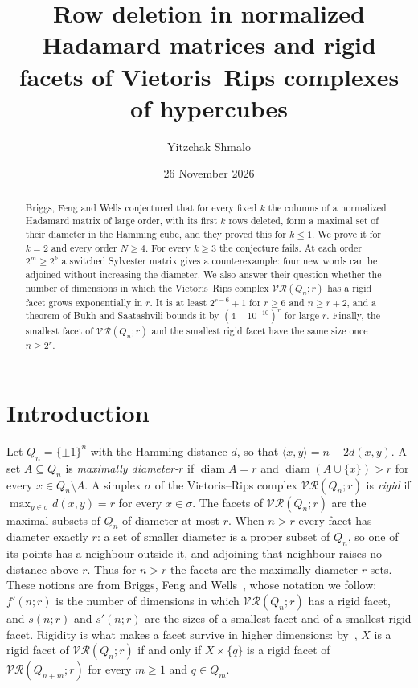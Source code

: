 \documentclass[11pt]{amsart}
\theoremstyle{remark}
\newcommand{\VR}{\mathcal{VR}}
\DeclareMathOperator{\diam}{diam}
\begin{document}
\title[Row deletion and rigid facets]{Row deletion in normalized Hadamard matrices and rigid facets of
Vietoris--Rips complexes of hypercubes}
\author{Yitzchak Shmalo}
\date{26 November 2026}
\address{Einstein Institute of Mathematics, The Hebrew University of Jerusalem, Jerusalem, Israel}

\begin{abstract}
Briggs, Feng and Wells conjectured that for every fixed $k$ the columns of a normalized Hadamard matrix of large order,
with its first $k$ rows deleted, form a maximal set of their diameter in the Hamming cube, and they proved this for
$k\le 1$. We prove it for $k=2$ and every order $N\ge4$. For every $k\ge 3$ the conjecture fails. At each order $2^m\ge 2^k$ a
switched Sylvester matrix gives a counterexample: four new words can be adjoined without increasing the
diameter. We also answer their question whether the number of dimensions in which the Vietoris--Rips complex
$\VR(Q_n;r)$ has a rigid facet grows exponentially in $r$. It is at least $2^{r-6}+1$ for $r\ge 6$ and $n\ge r+2$, and
a theorem of Bukh and Saatashvili bounds it by $(4-10^{-10})^r$ for large $r$. Finally, the smallest facet of
$\VR(Q_n;r)$ and the smallest rigid facet have the same size once $n\ge 2^r$.
\end{abstract}

\maketitle

\section{Introduction}

Let $Q_n=\{\pm1\}^n$ with the Hamming distance $d$, so that $\langle x,y\rangle=n-2d(x,y)$. A set $A\subseteq Q_n$ is
\emph{maximally diameter-$r$} if $\diam A=r$ and $\diam(A\cup\{x\})>r$ for every $x\in Q_n\setminus A$. A simplex
$\sigma$ of the Vietoris--Rips complex $\VR(Q_n;r)$ is \emph{rigid} if $\max_{y\in\sigma}d(x,y)=r$ for every
$x\in\sigma$. The facets of $\VR(Q_n;r)$ are the maximal subsets of $Q_n$ of diameter at most $r$. When $n>r$ every
facet has diameter exactly $r$: a set of smaller diameter is a proper subset of $Q_n$, so one of its points has a
neighbour outside it, and adjoining that neighbour raises no distance above $r$. Thus for $n>r$ the facets are the
maximally diameter-$r$ sets. These notions are
from Briggs, Feng and Wells~\cite{BFW}, whose notation we follow: $f'(n;r)$ is the number of dimensions in which
$\VR(Q_n;r)$ has a rigid facet, and $s(n;r)$ and $s'(n;r)$ are the sizes of a smallest facet and of a smallest rigid
facet. Rigidity is what makes a facet survive in higher dimensions: by~\cite[Corollary~6]{BFW}, $X$ is a rigid facet of
$\VR(Q_n;r)$ if and only if $X\times\{q\}$ is a rigid facet of $\VR(Q_{n+m};r)$ for every $m\ge1$ and $q\in Q_m$.
\end{document}
